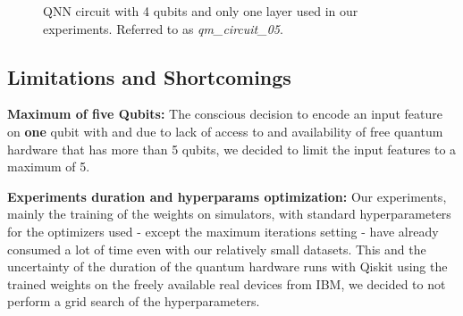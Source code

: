 \begin{figure}[!h]
	\centering
	\caption{QNN circuit with 4 qubits and only one layer used in our experiments. Referred to as \textit{qm\_circuit\_05}.}
	\label{figure:qnn_quantum_circuit_05}
\end{figure}


\subsection{Limitations and Shortcomings}
\label{subsection:limitations_and_shortcomings}

\textbf{Maximum of five Qubits:} The conscious decision to encode an input feature on \textbf{one} qubit with  and due to lack of access to and availability of free quantum hardware that has more than 5 qubits, we decided to limit the input features to a maximum of 5.

\textbf{Experiments duration and hyperparams optimization:} Our experiments, mainly the training of the weights on simulators, with standard hyperparameters for the optimizers used - except the maximum iterations setting - have already consumed a lot of time even with our relatively small datasets. This and the uncertainty of the duration of the quantum hardware runs with Qiskit using the trained weights on the freely available real devices from IBM, we decided to not perform a grid search of the hyperparameters.


\clearpage






